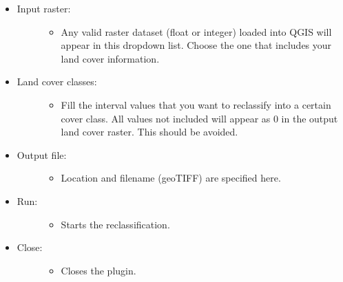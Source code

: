 \documentclass[letterpaper,10pt,english]{sphinxmanual}
\begin{document}
\begin{itemize}
\item {} \begin{description}
\item[{Input raster:}] \leavevmode\begin{itemize}
\item {} 
Any valid raster dataset (float or integer) loaded into QGIS will appear in this dropdown list. Choose the one that includes your land cover information.

\end{itemize}

\end{description}

\item {} \begin{description}
\item[{Land cover classes:}] \leavevmode\begin{itemize}
\item {} 
Fill the interval values that you want to reclassify into a certain cover class. All values not included will appear as 0 in the output land cover raster. This should be avoided.

\end{itemize}

\end{description}

\item {} \begin{description}
\item[{Output file:}] \leavevmode\begin{itemize}
\item {} 
Location and filename (geoTIFF) are specified here.

\end{itemize}

\end{description}

\item {} \begin{description}
\item[{Run:}] \leavevmode\begin{itemize}
\item {} 
Starts the reclassification.

\end{itemize}

\end{description}

\item {} \begin{description}
\item[{Close:}] \leavevmode\begin{itemize}
\item {} 
Closes the plugin.

\end{itemize}

\end{description}

\end{itemize}
\end{document}
